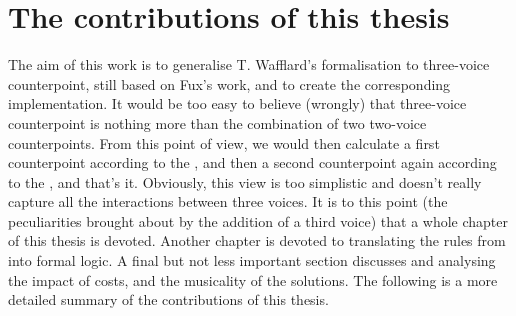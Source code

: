\section{The contributions of this thesis}
The aim of this work is to generalise T. Wafflard's formalisation to three-voice counterpoint, still based on Fux's work, and to create the corresponding implementation. It would be too easy to believe (wrongly) that three-voice counterpoint is nothing more than the combination of two two-voice counterpoints. From this point of view, we would then calculate a first counterpoint according to the \cf, and then a second counterpoint again according to the \cf, and that's it. Obviously, this view is too simplistic and doesn't really capture all the interactions between three voices. It is to this point (the peculiarities brought about by the addition of a third voice) that a whole chapter of this thesis is devoted. Another chapter is devoted to translating the rules from \gaps into formal logic. A final but not less important section discusses and analysing the impact of costs, and the musicality of the solutions. The following is a more detailed summary of the contributions of this thesis. 
